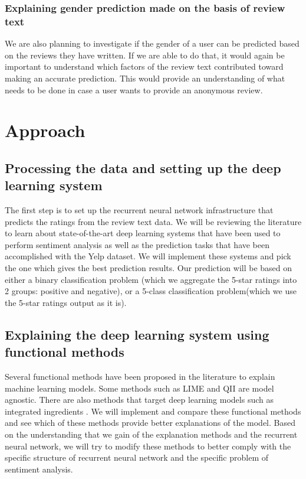 \documentclass[11pt, twocolumn]{article}
\begin{document}
\subsubsection{Explaining gender prediction made on the basis of review text}

We are also planning to investigate if the gender of a user can be predicted based on the reviews they have written. If we are able to do that, it would again be important to understand which factors of the review text contributed toward making an accurate prediction. This would provide an understanding of what needs to be done in case a user wants to provide an anonymous review.

\section{Approach}

\subsection{Processing the data and setting up the deep learning system}
\label{step:rating-prediction}

The first step is to set up the recurrent neural network infrastructure \cite{Tang2015} that predicts the ratings from the review text data. We will be reviewing the literature to learn about state-of-the-art deep learning systems that have been used to perform sentiment analysis as well as the prediction tasks that have been accomplished with the Yelp dataset. We will implement these systems and pick the one which gives the best prediction results. Our prediction will be based on either a binary classification problem (which we aggregate the 5-star ratings into 2 groups: positive and negative), or a 5-class classification problem(which we use the 5-star ratings output as it is). 

\subsection{Explaining the deep learning system using functional methods}
\label{step:rating-prediction-explanation}

Several functional methods have been proposed in the literature to explain machine learning models. Some methods such as LIME \cite{Ribeiro2016} and QII \cite{Datta2017} are model agnostic. There are also methods that target deep learning models such as integrated ingredients \cite{Sundararajan2017}. We will implement and compare these functional methods and see which of these methods provide better explanations of the model. Based on the understanding that we gain of the explanation methods and the recurrent neural network, we will try to modify these methods to better comply with the specific structure of recurrent neural network and the specific problem of sentiment analysis.
\end{document}
